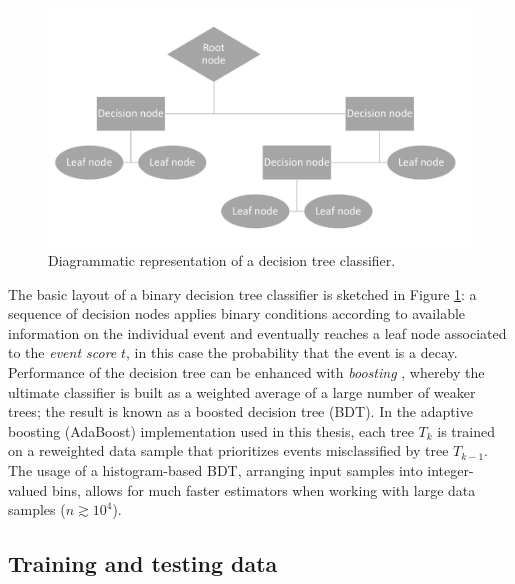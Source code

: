 \begin{figure}
	\centering
	\includegraphics[height=.3\textheight]{graphics/04-event_selection/decision_tree.pdf}
	\caption{Diagrammatic representation of a decision tree classifier.}
	\label{fig:4:decision_tree}
\end{figure}

The basic layout of a binary decision tree classifier is sketched in Figure \ref{fig:4:decision_tree}:
a sequence of decision nodes applies binary conditions according to available information on the individual event and eventually reaches a leaf node associated to the \textit{event score} $t$, in this case the probability that the event is a \demonstratorshort decay.
Performance of the decision tree can be enhanced with \textit{boosting} \cite{Yann:2013}, whereby the ultimate classifier is built as a weighted average of a large number of weaker trees;
the result is known as a boosted decision tree (BDT).
In the adaptive boosting (AdaBoost) implementation used in this thesis, each tree $T_k$ is trained on a reweighted data sample that prioritizes events misclassified by tree $T_{k-1}$.
The usage of a histogram-based BDT, arranging input samples into integer-valued bins, allows for much faster estimators when working with large data samples ($n \gtrsim {10}^4$).


\subsection{Training and testing data}
\label{sec:4:train_test_data}

